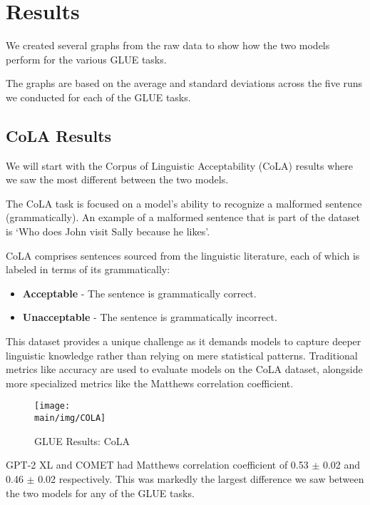 \documentclass[\main/thesis.tex]{subfiles}
\begin{document}
\chapter{Results}

We created several graphs from the raw data to show how the two models perform for the various GLUE tasks. 

The graphs are based on the average and standard deviations across the five runs we 
conducted for each of the GLUE tasks. 

\section{CoLA Results}\label{sec:cola_results}

We will start with the Corpus of Linguistic Acceptability (CoLA) results where we saw the most different between the two models. 

The CoLA task is focused on a model's ability 
to recognize a malformed sentence (grammatically). An example of a malformed sentence that is 
part of the dataset is `Who does John visit Sally because he likes'.

CoLA comprises sentences sourced from the linguistic literature, each of which is labeled in terms of its grammatically:
\begin{itemize}
    \item \textbf{Acceptable} - The sentence is grammatically correct.
    \item \textbf{Unacceptable} - The sentence is grammatically incorrect.
\end{itemize}

This dataset provides a unique challenge as it demands models to capture deeper linguistic knowledge rather than relying on mere statistical patterns. 
Traditional metrics like accuracy are used to evaluate models on the CoLA dataset, alongside more specialized metrics like the Matthews correlation coefficient.

\begin{figure}
    \texttt{[image: \\main/img/COLA]}
    \caption[GLUE Results: CoLA] {GLUE Results: CoLA}
    \label{fig:cola_fig}
\end{figure}

GPT-2 XL and COMET had  Matthews correlation coefficient of 0.53 $\pm$ 0.02 and 0.46 $\pm$ 0.02 respectively. This was markedly the largest
difference we saw between the two models for any of the GLUE tasks. 
\end{document}
